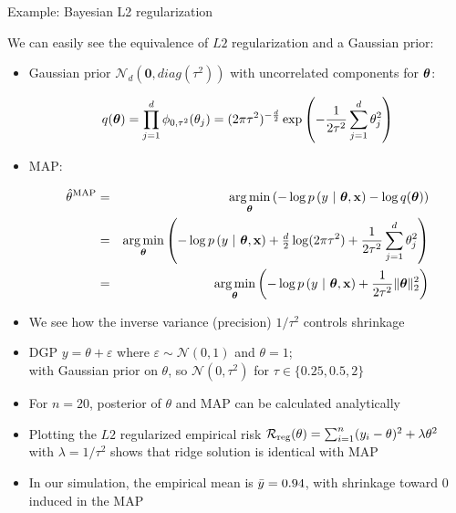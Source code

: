 \documentclass[11pt,compress,t,notes=noshow, xcolor=table]{beamer}
\begin{document}
\begin{vbframe}{Example: Bayesian L2 regularization}

\small We can easily see the equivalence of $L2$ regularization and a Gaussian 
prior:

\begin{itemize}
  \small
  \item Gaussian prior $\mathcal{N}_d(\bm{0}, \mathit{diag}(\tau^2))$ with uncorrelated components for $\bm{\theta}$:
  \begin{footnotesize}
    $$q(\bm{\theta}) = \prod_{j = 1}^d  \phi_{0,\tau^2}(\theta_j) 
    = (2\pi\tau^2)^{-\frac{d}{2}} \exp \left( - \frac{1}{2\tau^2} \sum_{j = 1}^d 
    \theta_j^2 \right)$$
  \end{footnotesize} 
  \item MAP:
  \begin{footnotesize}
  \begin{eqnarray*}
    \hat{\theta}^{\text{MAP}} &=& \operatorname*{arg\,min}_{\bm{\theta}} \left(
    - \log p\left(y ~|~ \bm{\theta}, \mathbf{x} \right) - \log q(\bm{\theta})
    \right) \\
    &=& \operatorname*{arg\,min}_{\bm{\theta}} \left(
    - \log p\left(y ~|~ \bm{\theta}, \mathbf{x} \right) + \tfrac{d}{2} \log(2\pi \tau^2) +
    \frac{1}{2\tau^2} \sum_{j = 1}^d \theta_j^2
    \right) \\
    &=& \operatorname*{arg\,min}_{\bm{\theta}} \left(
    - \log p\left(y ~|~ \bm{\theta}, \mathbf{x} \right) + \frac{1}{2\tau^2} \| \bm{\theta} \|_2^2
    \right)
  \end{eqnarray*}
  \end{footnotesize} 
  \item We see how the inverse variance (precision) $1/\tau^2$ controls shrinkage
\end{itemize}

\framebreak

\begin{itemize}
    \item DGP $y = \theta + \varepsilon$ where $\varepsilon \sim \mathcal{N}(0,1)$ and $\theta=1$;\\
    with Gaussian prior on $\theta$, so $\mathcal{N}(0, \tau^2)$ for $\tau \in \{0.25, 0.5, 2\}$
    \item For $n=20$, posterior of $\theta$ and MAP can be calculated analytically
    \item Plotting the $L2$ regularized empirical risk $\mathcal{R}_{\text{reg}}(\theta) = \sum_{i=1}^{n} (y_i-\theta)^2+\lambda \theta^2$ with $\lambda = 1/\tau^2$ shows that ridge solution is identical with MAP
    \item In our simulation, the empirical mean is $\Bar{y}=0.94$, with shrinkage toward $0$ induced in the MAP
\end{itemize}


\end{vbframe}
\end{document}
